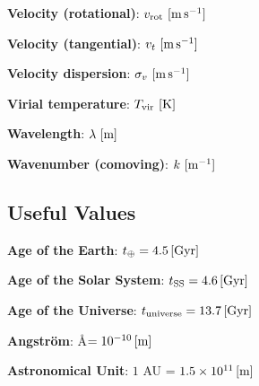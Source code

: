 \documentclass[a4paper,11pt]{article}
\begin{document}
{\noindent}\textbf{Velocity (rotational)}: $v_\mathrm{rot} ~ [{\rm m\,s^{-1}}]$

{\noindent}\textbf{Velocity (tangential)}: $v_t ~ [{\rm m\,s^{-1}}]$

{\noindent}\textbf{Velocity dispersion}: $\sigma_v ~ [{\rm m\,s^{-1}}]$

{\noindent}\textbf{Virial temperature}: $T_\mathrm{vir} ~ [{\rm K}]$

{\noindent}\textbf{Wavelength}: $\lambda ~ [{\rm m}]$

{\noindent}\textbf{Wavenumber (comoving)}: $k ~ [{\rm m^{-1}}]$






































\newpage
\subsection{Useful Values}

{\noindent}\textbf{Age of the Earth}: $t_\oplus = 4.5\,[{\rm Gyr}]$

{\noindent}\textbf{Age of the Solar System}: $t_\mathrm{SS} = 4.6\,[{\rm Gyr}]$

{\noindent}\textbf{Age of the Universe}: $t_\mathrm{universe} = 13.7\,[{\rm Gyr}]$

{\noindent}\textbf{Angstr\"{o}m}: \AA$ = 10^{-10}\,[{\rm m}]$

{\noindent}\textbf{Astronomical Unit}: $1$ AU = $1.5\times10^{11}\,[{\rm m}]$
\end{document}
